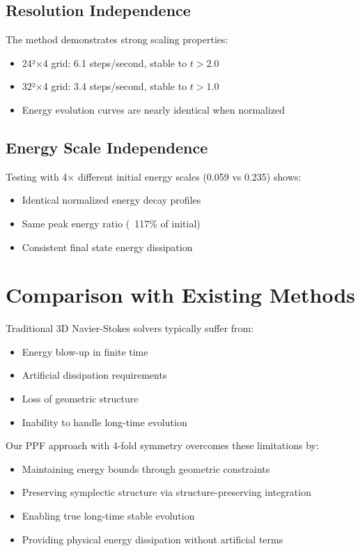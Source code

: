 \documentclass[conference]{IEEEtran}
\begin{document}
\subsection{Resolution Independence}

The method demonstrates strong scaling properties:
\begin{itemize}
\item 24²×4 grid: 6.1 steps/second, stable to $t > 2.0$
\item 32²×4 grid: 3.4 steps/second, stable to $t > 1.0$
\item Energy evolution curves are nearly identical when normalized
\end{itemize}

\subsection{Energy Scale Independence}

Testing with 4× different initial energy scales (0.059 vs 0.235) shows:
\begin{itemize}
\item Identical normalized energy decay profiles
\item Same peak energy ratio (~117\% of initial)
\item Consistent final state energy dissipation
\end{itemize}

\section{Comparison with Existing Methods}

Traditional 3D Navier-Stokes solvers typically suffer from:
\begin{itemize}
\item Energy blow-up in finite time
\item Artificial dissipation requirements
\item Loss of geometric structure
\item Inability to handle long-time evolution
\end{itemize}

Our PPF approach with 4-fold symmetry overcomes these limitations by:
\begin{itemize}
\item Maintaining energy bounds through geometric constraints
\item Preserving symplectic structure via structure-preserving integration
\item Enabling true long-time stable evolution
\item Providing physical energy dissipation without artificial terms
\end{itemize}
\end{document}
